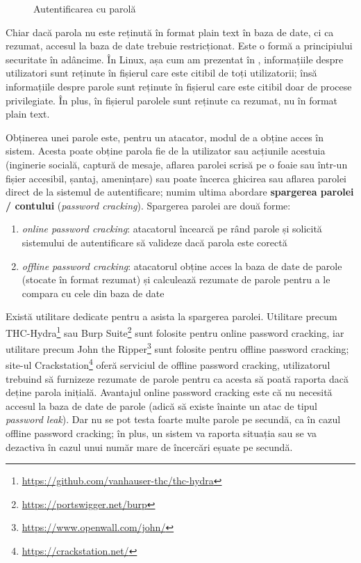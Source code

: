 \begin{figure}[htbp]
  \centering
  \def\svgwidth{\columnwidth}
  
  \caption{Autentificarea cu parolă}
  \label{fig:sec:password-auth-hashing}
\end{figure}

Chiar dacă parola nu este reținută în format plain text în baza de date, ci ca rezumat, accesul la baza de date trebuie restricționat. Este o formă a principiului securitate în adâncime. În Linux, așa cum am prezentat în , informațiile despre utilizatori sunt reținute în fișierul  care este citibil de toți utilizatorii; însă informațiile despre parole sunt reținute în fișierul  care este citibil doar de procese privilegiate. În plus, în fișierul  parolele sunt reținute ca rezumat, nu în format plain text.

Obținerea unei parole este, pentru un atacator, modul de a obține acces în sistem. Acesta poate obține parola fie de la utilizator sau acțiunile acestuia (inginerie socială, captură de mesaje, aflarea parolei scrisă pe o foaie sau într-un fișier accesibil, șantaj, amenințare) sau poate încerca ghicirea sau aflarea parolei direct de la sistemul de autentificare; numim ultima abordare \textbf{spargerea parolei / contului} (\textit{password cracking}). Spargerea parolei are două forme:

\begin{enumerate}
  \item \textit{online password cracking}: atacatorul încearcă pe rând parole și solicită sistemului de autentificare să valideze dacă parola este corectă
  \item \textit{offline password cracking}: atacatorul obține acces la baza de date de parole (stocate în format rezumat) și calculează rezumate de parole pentru a le compara cu cele din baza de date
\end{enumerate}

Există utilitare dedicate pentru a asista la spargerea parolei. Utilitare precum THC-Hydra\footnote{\url{https://github.com/vanhauser-thc/thc-hydra}} sau Burp Suite\footnote{\url{https://portswigger.net/burp}} sunt folosite pentru online password cracking, iar utilitare precum John the Ripper\footnote{\url{https://www.openwall.com/john/}} sunt folosite pentru offline password cracking; site-ul Crackstation\footnote{\url{https://crackstation.net/}} oferă serviciul de offline password cracking, utilizatorul trebuind să furnizeze rezumate de parole pentru ca acesta să poată raporta dacă deține parola inițială. Avantajul online password cracking este că nu necesită accesul la baza de date de parole (adică să existe înainte un atac de tipul \textit{password leak}). Dar nu se pot testa foarte multe parole pe secundă, ca în cazul offline password cracking; în plus, un sistem va raporta situația sau se va dezactiva în cazul unui număr mare de încercări eșuate pe secundă.


